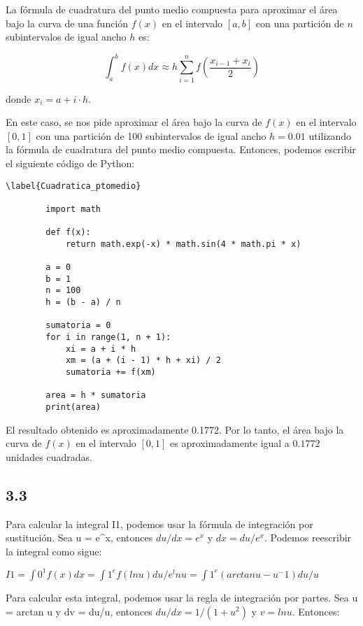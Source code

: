 \documentclass[12pt]{article}
\begin{document}
      La fórmula de cuadratura del punto medio compuesta para aproximar el área bajo la curva de una función $f(x)$ en el intervalo $[a,b]$ con una partición de $n$ subintervalos de igual ancho $h$ es:

      $$\int_{a}^{b} f(x) dx \approx h \sum_{i=1}^{n} f\left(\frac{x_{i-1}+x_{i}}{2}\right)$$
      
      donde $x_i = a + i \cdot h$.
      
      En este caso, se nos pide aproximar el área bajo la curva de $f(x)$ en el intervalo $[0,1]$ con una partición de 100 subintervalos de igual ancho $h=0.01$ utilizando la fórmula de cuadratura del punto medio compuesta. Entonces, podemos escribir el siguiente código de Python:
      
      \begin{lstlisting}\label{Cuadratica_ptomedio}
        
        import math

        def f(x):
            return math.exp(-x) * math.sin(4 * math.pi * x)

        a = 0
        b = 1
        n = 100
        h = (b - a) / n

        sumatoria = 0
        for i in range(1, n + 1):
            xi = a + i * h
            xm = (a + (i - 1) * h + xi) / 2
            sumatoria += f(xm)

        area = h * sumatoria
        print(area)

      \end{lstlisting}  

      El resultado obtenido es aproximadamente 0.1772. Por lo tanto, el área bajo la curva de $f(x)$ en el intervalo $[0,1]$ es aproximadamente igual a $0.1772$ unidades cuadradas.

    \subsection{3.3}

    Para calcular la integral I1, podemos usar la fórmula de integración por sustitución. Sea u = e^x, entonces $du/dx = e^x$ y $dx = du/e^x$. Podemos reescribir la integral como sigue:

    $I1 = ∫0^1 f(x) dx = ∫1^e f(ln u) du/e^ln u = ∫1^e (arctan u - u^-1) du/u$
    
    Para calcular esta integral, podemos usar la regla de integración por partes. Sea u = arctan u y dv = du/u, entonces $du/dx = 1/(1+u^2)$ y $v = ln u$. Entonces:
    
\end{document}
